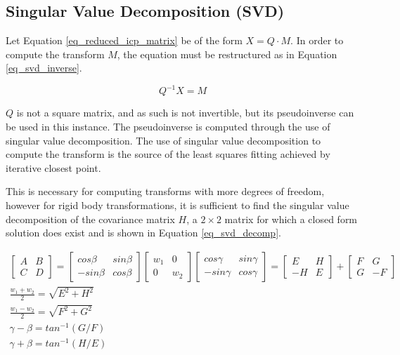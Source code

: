 \documentclass{article}
\begin{document}
\subsection{Singular Value Decomposition (SVD)}

Let Equation \ref{eq_reduced_icp_matrix} be of the form $X=Q \cdot M$. In order to compute the transform $M$, the equation must be restructured as in Equation \ref{eq_svd_inverse}.

\begin{equation}
Q^{-1} X = M
\label{eq_svd_inverse}
\end{equation}

$Q$ is not a square matrix, and as such is not invertible, but its pseudoinverse can be used in this instance. The pseudoinverse is computed through the use of singular value decomposition. The use of singular value decomposition to compute the transform is the source of the least squares fitting achieved by iterative closest point.

This is necessary for computing transforms with more degrees of freedom, however for rigid body transformations, it is sufficient to find the singular value decomposition of the covariance matrix $H$, a $2 \times 2$ matrix for which a closed form solution does exist\cite{blinn_consider_1996} and is shown in Equation \ref{eq_svd_decomp}.

\begin{equation}
\begin{gathered}
	\begin{bmatrix}
	A & B \\
	C & D
	\end{bmatrix}
	=
	\begin{bmatrix}
	cos\beta & sin\beta \\
	-sin\beta & cos\beta
	\end{bmatrix}
	\begin{bmatrix}
	w_1 & 0 \\
	0 & w_2
	\end{bmatrix}
	\begin{bmatrix}
	cos\gamma & sin\gamma \\
	-sin\gamma & cos\gamma
	\end{bmatrix}
	=
	\begin{bmatrix}
	E & H \\
	-H & E
	\end{bmatrix}
	+
	\begin{bmatrix}
	F & G \\
	G & -F
	\end{bmatrix}
	\\
	\frac{w_1 + w_2}{2} = \sqrt{E^2 + H^2}
	\\
	\frac{w_1 - w_2}{2} = \sqrt{F^2 + G^2}
	\\
	\gamma - \beta = tan^{-1}(G/F)
	\\
	\gamma + \beta = tan^{-1}(H/E)
\end{gathered}
\label{eq_svd_decomp}
\end{equation}
\end{document}
